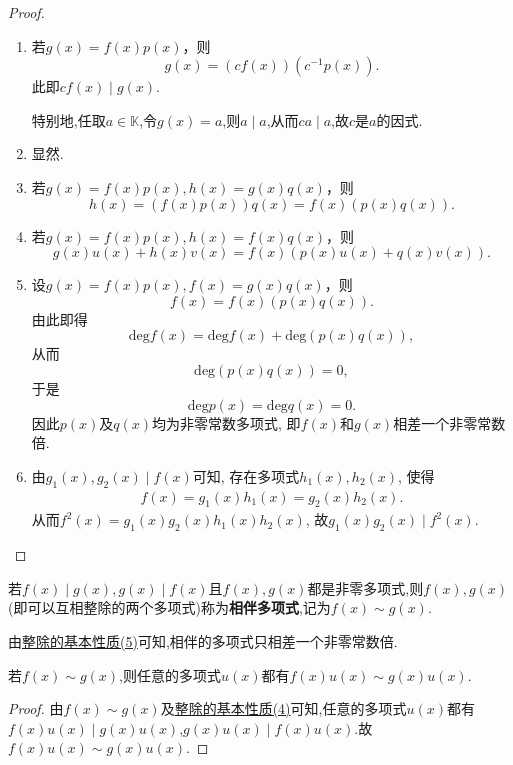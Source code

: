 \documentclass[../../main.tex]{subfiles}%
\begin{document}
\begin{proof}
\begin{enumerate}[(1)]
\item 若\(g(x)=f(x)p(x)\)，则
\[
g(x)=(cf(x))(c^{-1}p(x)).
\]
此即\(cf(x)\mid g(x)\).

特别地,任取$a\in \mathbb{K}$,令$g(x)=a$,则$a\mid a$,从而$ca \mid a$,故$c$是$a$的因式.

\item 显然.

\item 若\(g(x)=f(x)p(x),h(x)=g(x)q(x)\)，则
\[
h(x)=(f(x)p(x))q(x)=f(x)(p(x)q(x)).
\]

\item 若\(g(x)=f(x)p(x),h(x)=f(x)q(x)\)，则
\[
g(x)u(x)+h(x)v(x)=f(x)(p(x)u(x)+q(x)v(x)).
\]

\item 设\(g(x)=f(x)p(x),f(x)=g(x)q(x)\)，则
\[
f(x)=f(x)(p(x)q(x)).
\]
由此即得
\[
\mathrm{deg }f(x)=\mathrm{deg }f(x)+\mathrm{deg}(p(x)q(x)),
\]
从而
\[
\mathrm{deg}(p(x)q(x)) = 0,
\]
于是
\[
\mathrm{deg }p(x)=\mathrm{deg }q(x)=0.
\]
因此\(p(x)\)及\(q(x)\)均为非零常数多项式, 即\(f(x)\)和\(g(x)\)相差一个非零常数倍.

\item 由\(g_1(x),g_2(x)\mid f(x)\)可知, 存在多项式\(h_1(x),h_2(x)\), 使得
\begin{align*}
f(x) = g_1(x)h_1(x) = g_2(x)h_2(x).
\end{align*}
从而\(f^2(x) = g_1(x)g_2(x)h_1(x)h_2(x)\), 故\(g_1(x)g_2(x)\mid f^2(x)\). 
\end{enumerate}

\end{proof}

\begin{definition}[相伴多项式]\label{definition:}
若\(f(x)\mid g(x),g(x)\mid f(x)\)且\(f(x),g(x)\)都是非零多项式,则$f(x),g(x)$(即可以互相整除的两个多项式)称为\textbf{相伴多项式},记为\(f(x)\sim g(x)\).
\end{definition}
\begin{note}
由\hyperref[proposition:整除的基本性质]{整除的基本性质(5)}可知,相伴的多项式只相差一个非零常数倍.
\end{note}

\begin{proposition}[相伴多项式的基本性质]\label{proposition:相伴多项式的基本性质}
若$f(x)\sim g(x)$,则任意的多项式$u(x)$都有$f(x)u(x)\sim g(x)u(x)$.
\end{proposition}
\begin{proof}

由$f(x)\sim g(x)$及\hyperref[proposition:整除的基本性质]{整除的基本性质(4)}可知,任意的多项式$u(x)$都有$f(x)u(x)\mid g(x)u(x)$,$g(x)u(x)\mid f(x)u(x)$.故$f(x)u(x)\sim g(x)u(x)$.

\end{proof}
\end{document}
